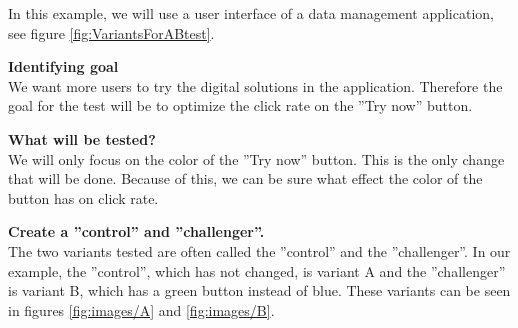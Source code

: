 In this example, we will use a user interface of a data management application, see figure \ref{fig:VariantsForABtest}. 



\textbf{Identifying goal} \\
We want more users to try the digital solutions in the application. Therefore the goal for the test will be to optimize the click rate on the ''Try now'' button.

\textbf{What will be tested?}\\
We will only focus on the color of the ''Try now'' button. This is the only change that will be done. Because of this, we can be sure what effect the color of the button has on click rate. 

\textbf{Create a ''control'' and ''challenger''. }\\
The two variants tested are often called the ''control'' and the ''challenger''. In our example, the ''control'', which has not changed, is variant A and the ''challenger'' is variant B, which has a green button instead of blue. These variants can be seen in figures \ref{fig:images/A} and \ref{fig:images/B}.


